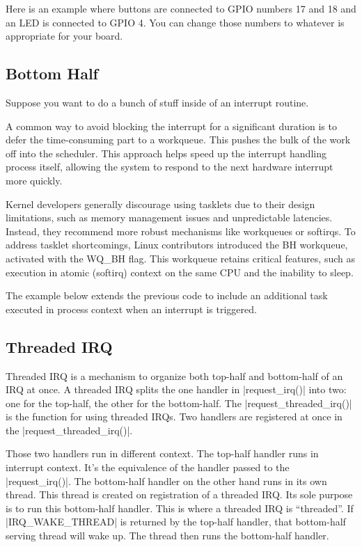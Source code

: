 \documentclass[10pt, oneside]{book}
\begin{document}
Here is an example where buttons are connected to GPIO numbers 17 and 18 and an LED is connected to GPIO 4.
You can change those numbers to whatever is appropriate for your board.


\subsection{Bottom Half}
\label{sec:bottom_half}
Suppose you want to do a bunch of stuff inside of an interrupt routine.

A common way to avoid blocking the interrupt for a significant duration
is to defer the time-consuming part to a workqueue. This pushes the bulk
of the work off into the scheduler.
This approach helps speed up the interrupt handling process itself,
allowing the system to respond to the next hardware interrupt more quickly.

Kernel developers generally discourage using tasklets due to their design limitations,
such as memory management issues and unpredictable latencies.
Instead, they recommend more robust mechanisms like workqueues or softirqs.
To address tasklet shortcomings, Linux contributors introduced the BH workqueue, 
activated with the WQ_BH flag. This workqueue retains critical features, 
such as execution in atomic (softirq) context on the same CPU and the inability to sleep.

The example below extends the previous code to include an additional task executed in process context when an interrupt is triggered.

\subsection{Threaded IRQ}

Threaded IRQ is a mechanism to organize both top-half and bottom-half of an IRQ at once.
A threaded IRQ splits the one handler in \cpp|request_irq()| into two: one for the top-half, the other for the bottom-half.
The \cpp|request_threaded_irq()| is the function for using threaded IRQs.
Two handlers are registered at once in the \cpp|request_threaded_irq()|.

Those two handlers run in different context.
The top-half handler runs in interrupt context.
It's the equivalence of the handler passed to the \cpp|request_irq()|.
The bottom-half handler on the other hand runs in its own thread.
This thread is created on registration of a threaded IRQ.
Its sole purpose is to run this bottom-half handler.
This is where a threaded IRQ is ``threaded''.
If \cpp|IRQ_WAKE_THREAD| is returned by the top-half handler, that bottom-half serving thread will wake up.
The thread then runs the bottom-half handler.
\end{document}
